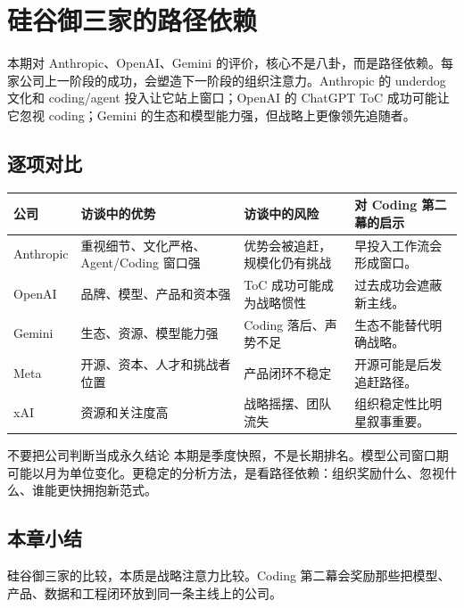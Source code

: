 \section{硅谷御三家的路径依赖}

本期对 Anthropic、OpenAI、Gemini 的评价，核心不是八卦，而是路径依赖。每家公司上一阶段的成功，会塑造下一阶段的组织注意力。Anthropic 的 underdog 文化和 coding/agent 投入让它站上窗口；OpenAI 的 ChatGPT ToC 成功可能让它忽视 coding；Gemini 的生态和模型能力强，但战略上更像领先追随者。

\subsection{逐项对比}

\noindent\begin{longtable}{p{}p{}p{}p{}}
\toprule
公司 & 访谈中的优势 & 访谈中的风险 & 对 Coding 第二幕的启示 \\
\midrule
Anthropic & 重视细节、文化严格、Agent/Coding 窗口强 & 优势会被追赶，规模化仍有挑战 & 早投入工作流会形成窗口。 \\
OpenAI & 品牌、模型、产品和资本强 & ToC 成功可能成为战略惯性 & 过去成功会遮蔽新主线。 \\
Gemini & 生态、资源、模型能力强 & Coding 落后、声势不足 & 生态不能替代明确战略。 \\
Meta & 开源、资本、人才和挑战者位置 & 产品闭环不稳定 & 开源可能是后发追赶路径。 \\
xAI & 资源和关注度高 & 战略摇摆、团队流失 & 组织稳定性比明星叙事重要。 \\
\bottomrule
\end{longtable}

\begin{warningbox}{不要把公司判断当成永久结论}
本期是季度快照，不是长期排名。模型公司窗口期可能以月为单位变化。更稳定的分析方法，是看路径依赖：组织奖励什么、忽视什么、谁能更快拥抱新范式。
\end{warningbox}

\subsection{本章小结}

硅谷御三家的比较，本质是战略注意力比较。Coding 第二幕会奖励那些把模型、产品、数据和工程闭环放到同一条主线上的公司。

